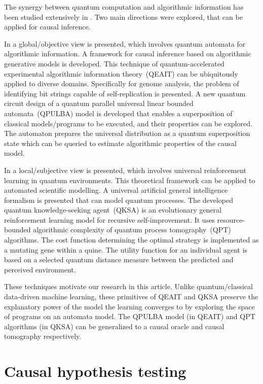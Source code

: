 \documentclass[%
 aps,
 jmp,%
 amsmath,amssymb,
 reprint,%
]{revtex4-2}
\begin{document}
The synergy between quantum computation and algorithmic information has been studied extensively in \cite{sarkar2022applications}.
Two main directions were explored, that can be applied for causal inference.

In \cite{sarkar2021estimating} a global/objective view is presented, which involves quantum automata for algorithmic information.
A framework for causal inference based on algorithmic generative models is developed. 
This technique of quantum-accelerated experimental algorithmic information theory~(QEAIT) can be ubiquitously applied to diverse domains. 
Specifically for genome analysis, the problem of identifying bit strings capable of self-replication is presented. 
A new quantum circuit design of a quantum parallel universal linear bounded automata~(QPULBA) model is developed that enables a superposition of classical models/programs to be executed, and their properties can be explored. 
The automaton prepares the universal distribution as a quantum superposition state which can be queried to estimate algorithmic properties of the causal model.

In \cite{sarkar2021qksa} a local/subjective view is presented, which involves universal reinforcement learning in quantum environments.
This theoretical framework can be applied to automated scientific modelling. 
A universal artificial general intelligence formalism is presented that can model quantum processes. 
The developed quantum knowledge-seeking agent~(QKSA) is an evolutionary general reinforcement learning model for recursive self-improvement. 
It uses resource-bounded algorithmic complexity of quantum process tomography~(QPT) algorithms. 
The cost function determining the optimal strategy is implemented as a mutating gene within a quine. 
The utility function for an individual agent is based on a selected quantum distance measure between the predicted and perceived environment.

These techniques motivate our research in this article.
Unlike quantum/classical data-driven machine learning, these primitives of QEAIT and QKSA preserve the explanatory power of the model the learning converges to by exploring the space of programs on an automata model.
The QPULBA model (in QEAIT) and QPT algorithms (in QKSA) can be generalized to a causal oracle and causal tomography respectively.

\section{Causal hypothesis testing} \label{sec:causal-hypothesis-testing}
\end{document}
